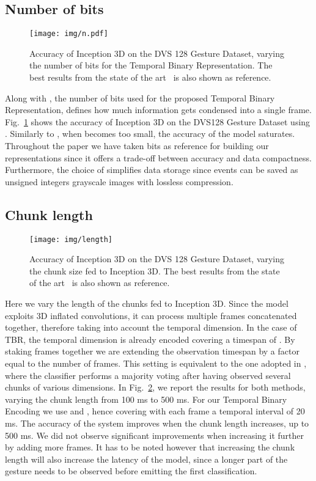 \documentclass[a4paper,conference]{IEEEtran}
\begin{document}
\subsection{Number of bits}
\begin{figure}[!t]
	\centering
	\texttt{[image: img/n.pdf]}
	\caption{Accuracy of Inception 3D on the DVS 128 Gesture Dataset, varying the number of bits for the Temporal Binary Representation. The best results from the state of the art~\cite{ghosh2019spatiotemporal} is also shown as reference.}
	\label{fig:n}
\end{figure}
Along with , the number of bits  used for the proposed Temporal Binary Representation, defines how much information gets condensed into a single frame. Fig.~\ref{fig:n} shows the accuracy of Inception 3D on the DVS128 Gesture Dataset using . Similarly to , when  becomes too small, the accuracy of the model saturates. Throughout the paper we have taken  bits as reference for building our representations since it offers a trade-off between accuracy and data compactness. Furthermore, the choice of  simplifies data storage since events can be saved as unsigned integers grayscale images with lossless compression.

\subsection{Chunk length}
\begin{figure}[t]
	\centering
	\texttt{[image: img/length]}
	\caption{Accuracy of Inception 3D on the DVS 128 Gesture Dataset, varying the chunk size fed to Inception 3D. The best results from the state of the art~\cite{ghosh2019spatiotemporal} is also shown as reference.}
	\label{fig:chunk}
\end{figure}
Here we vary the length of the chunks fed to Inception 3D. Since the model exploits 3D inflated convolutions, it can process multiple frames concatenated together, therefore taking into account the temporal dimension. In the case of TBR, the temporal dimension is already encoded covering a timespan of .
By staking frames together we are extending the observation timespan by a factor equal to the number of frames. This setting is equivalent to the one adopted in \cite{ghosh2019spatiotemporal}, where the classifier performs a majority voting after having observed several chunks of various dimensions.
In Fig.~\ref{fig:chunk}, we report the results for both methods, varying the chunk length from 100 ms to 500 ms. For our Temporal Binary Encoding we use  and , hence covering with each frame a temporal interval of 20 ms.
The accuracy of the system improves when the chunk length increases, up to 500 ms. We did not observe significant improvements when increasing it further by adding more frames. It has to be noted however that increasing the chunk length will also increase the latency of the model, since a longer part of the gesture needs to be observed before emitting the first classification.
\end{document}
